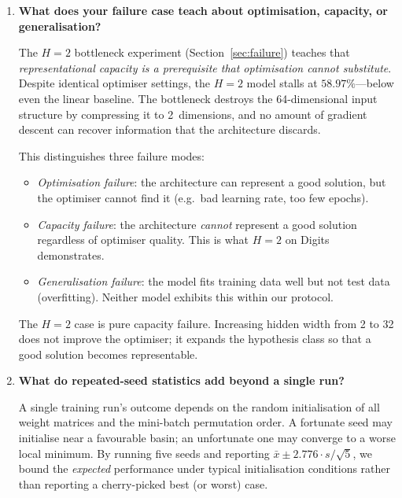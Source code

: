 \documentclass[11pt]{article}
\begin{document}
\begin{enumerate}[leftmargin=2em,itemsep=0.6em]
\emph{(b) When the added complexity is of the wrong kind.}  On Digits, Softmax Regression
at $m{=}20$ PCA dimensions achieves $94.08\%$, within $1.6$ points of the full neural
network ($95.71\%$), using a far simpler pipeline.  If the engineering cost of maintaining
a neural-network implementation is high and a 1.6-point accuracy difference is tolerable,
the linear model on reduced dimensions may be the better practical choice.

\item \textbf{What does your failure case teach about optimisation, capacity, or
generalisation?}

The $H{=}2$ bottleneck experiment (Section~\ref{sec:failure}) teaches that
\emph{representational capacity is a prerequisite that optimisation cannot substitute}.
Despite identical optimiser settings, the $H{=}2$ model stalls at $58.97\%$---below even
the linear baseline.  The bottleneck destroys the 64-dimensional input structure by
compressing it to 2~dimensions, and no amount of gradient descent can recover information
that the architecture discards.

This distinguishes three failure modes:
\begin{itemize}[leftmargin=1.4em,itemsep=0.1em]
  \item \emph{Optimisation failure}: the architecture can represent a good solution, but
        the optimiser cannot find it (e.g.\ bad learning rate, too few epochs).
  \item \emph{Capacity failure}: the architecture \emph{cannot} represent a good
        solution regardless of optimiser quality.  This is what $H{=}2$ on Digits
        demonstrates.
  \item \emph{Generalisation failure}: the model fits training data well but not test
        data (overfitting).  Neither model exhibits this within our protocol.
\end{itemize}

The $H{=}2$ case is pure capacity failure.  Increasing hidden width from 2 to 32 does not
improve the optimiser; it expands the hypothesis class so that a good solution becomes
representable.

\item \textbf{What do repeated-seed statistics add beyond a single run?}

A single training run's outcome depends on the random initialisation of all weight
matrices and the mini-batch permutation order.  A fortunate seed may initialise near a
favourable basin; an unfortunate one may converge to a worse local minimum.  By running
five seeds and reporting $\bar{x}\pm 2.776\cdot s/\!\sqrt{5}$, we bound the
\emph{expected} performance under typical initialisation conditions rather than reporting
a cherry-picked best (or worst) case.


\end{enumerate}
\end{document}
